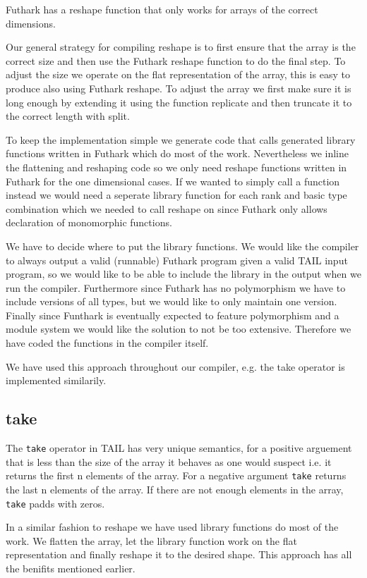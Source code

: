 \documentclass[11pt]{article}
\begin{document}
Futhark has a reshape function that only works for arrays of the correct dimensions.

Our general strategy for compiling reshape is to first ensure that the array is the correct size and then use the Futhark reshape
function to do the final step. To adjust the size we operate on the flat representation of the array, this is easy to produce also
using Futhark reshape. To adjust the array we first make sure it is long enough by extending it using the function replicate and then
truncate it to the correct length with split.

To keep the implementation simple we generate code that calls generated library functions written in Futhark which do most of the work.
Nevertheless we inline the flattening and reshaping code so we only need reshape functions written in Futhark
for the one dimensional cases. If we wanted to simply call a function instead we would need a seperate library function for each
rank and basic type combination which we needed to call reshape on since Futhark only allows declaration of monomorphic functions.

We have to decide where to put the library functions.
We would like the compiler to always output a valid (runnable) Futhark program given a valid TAIL input program, so we would like to
be able to include the library in the output when we run the compiler.
Furthermore since Futhark has no polymorphism we have to include versions of all types, but we would like to only maintain one version.
Finally since Funthark is eventually expected to feature polymorphism and a module system we would like the solution to not be too
extensive. Therefore we have coded the functions in the compiler itself.

We have used this approach throughout our compiler, e.g. the take operator is implemented similarily.

\subsection{take} 

The {\tt take} operator in TAIL has very unique semantics, for a positive arguement that is less than the size of the array it behaves as one would suspect i.e. it returns the first n elements of the array.
For a negative argument {\tt take} returns the last n elements of the array.
If there are not enough elements in the array, {\tt take} padds with zeros.

In a similar fashion to reshape we have used library functions do most of the work.
We flatten the array, let the library function work on the flat representation and finally reshape it to the desired shape.
This approach has all the benifits mentioned earlier.
\end{document}
